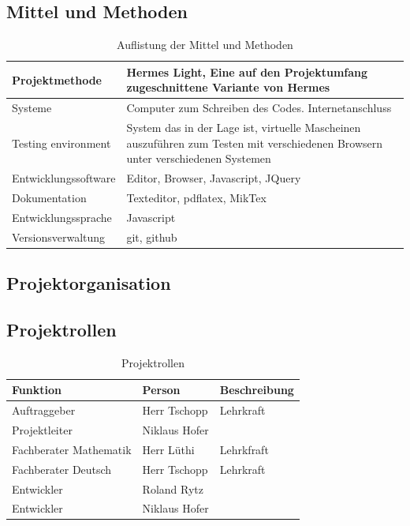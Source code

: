 \documentclass[11pt,paper=a4,final]{scrartcl}
\begin{document}
\subsection{Mittel und Methoden}
\begin{table}[h!]
 \centering
  \begin{tabular}{|l|p{10cm}|}
  \hline
  Projektmethode & Hermes Light, Eine auf den Projektumfang zugeschnittene Variante von Hermes \\ \hline
  Systeme & Computer zum Schreiben des Codes. Internetanschluss \\ \hline
  Testing environment & System das in der Lage ist, virtuelle Mascheinen auszuf\"uhren zum Testen mit verschiedenen Browsern unter verschiedenen Systemen \\ \hline
  Entwicklungssoftware & Editor, Browser, Javascript, JQuery \\ \hline
  Dokumentation & Texteditor, pdflatex, MikTex \\ \hline
  Entwicklungssprache & Javascript \\ \hline
  Versionsverwaltung & git, github \\ \hline
  \end{tabular}
  \caption{Auflistung der Mittel und Methoden}
\end{table}
\subsection{Projektorganisation}
\subsection{Projektrollen}
\begin{table}[h!]
  \centering
  \begin{tabular}{|l|l|l|}
    \hline
    \bf Funktion & \bf Person & \bf Beschreibung \\ \hline
    Auftraggeber & Herr Tschopp & Lehrkraft \\ \hline
    Projektleiter & Niklaus Hofer & \\ \hline
    Fachberater Mathematik & Herr L\"uthi & Lehrkfraft \\ \hline
    Fachberater Deutsch & Herr Tschopp & Lehrkraft \\ \hline
    Entwickler & Roland Rytz & \\ \hline
    Entwickler & Niklaus Hofer & \\ \hline
  \end{tabular}
  \caption{Projektrollen}
\end{table}
\end{document}
